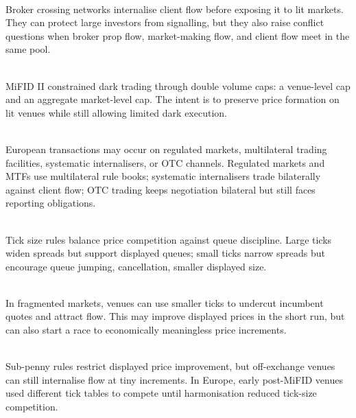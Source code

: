 \begin{mechanism} \\
Broker crossing networks internalise client flow before exposing it to lit markets.\\
They can protect large investors from signalling, but they also raise conflict questions when broker prop flow, market-making flow, and client flow meet in the same pool.
\end{mechanism}

\begin{marketrule} \\
MiFID II constrained dark trading through double volume caps: a venue-level cap and an aggregate market-level cap. The intent is to preserve price formation on lit venues while still allowing limited dark execution.
\end{marketrule}

\begin{taxonomy} \\
European transactions may occur on regulated markets, multilateral trading facilities, systematic internalisers, or OTC channels. Regulated markets and MTFs use multilateral rule books; systematic internalisers trade bilaterally against client flow; OTC trading keeps negotiation bilateral but still faces reporting obligations.
\end{taxonomy}

\begin{marketrule} \\
Tick size rules balance price competition against queue discipline. Large ticks widen spreads but support displayed queues; small ticks narrow spreads but encourage queue jumping, cancellation, smaller displayed size.
\end{marketrule}

\begin{caveat} \\
In fragmented markets, venues can use smaller ticks to undercut incumbent quotes and attract flow. This may improve displayed prices in the short run, but can also start a race to economically meaningless price increments.
\end{caveat}

\begin{marketrule} \\
Sub-penny rules restrict displayed price improvement, but off-exchange venues can still internalise flow at tiny increments. In Europe, early post-MiFID venues used different tick tables to compete until harmonisation reduced tick-size competition.
\end{marketrule}


